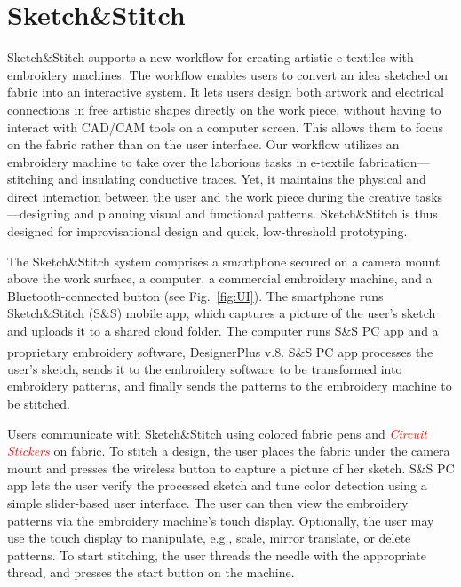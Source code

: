 \documentclass[header.tex]{subfiles}
\begin{document}
\section{Sketch\&Stitch}
Sketch\&Stitch supports a new workflow for creating artistic e-textiles with embroidery machines. The workflow enables users to convert an idea sketched on fabric into an interactive system. It lets users design both artwork and electrical connections in free artistic shapes directly on the work piece, without having to interact with CAD/CAM tools on a computer screen. This allows them to focus on the fabric rather than on the user interface. 
Our workflow utilizes an embroidery machine to take over the laborious tasks in e-textile fabrication---stitching and insulating conductive traces. Yet, it maintains the physical and direct interaction between the user and the work piece during the creative tasks---designing and planning visual and functional patterns. Sketch\&Stitch is thus designed for improvisational design and quick, low-threshold prototyping.



The Sketch\&Stitch system comprises a smartphone secured on a camera mount above the work surface, a computer, a commercial embroidery machine, and a Bluetooth-connected button (see Fig.\ \ref{fig:UI}). The smartphone runs Sketch\&Stitch (S\&S) mobile app, which captures a picture of the user's sketch and uploads it to a shared cloud folder. The computer runs S\&S PC app and a proprietary embroidery software, DesignerPlus\textsuperscript{\textregistered} v.8. S\&S PC app processes the user's sketch, sends it to the embroidery software to be transformed into embroidery patterns, and finally sends the patterns to the embroidery machine to be stitched. 


Users communicate with Sketch\&Stitch using colored fabric pens and \textcolor{red}{\textit{Circuit Stickers}} on fabric.
To stitch a design, the user places the fabric under the camera mount and presses the wireless button to capture a picture of her sketch. S\&S PC app lets the user verify the processed sketch and tune color detection using a simple slider-based user interface. The user can then view the embroidery patterns via the embroidery machine's touch display. Optionally, the user may use the touch display to manipulate, e.g., scale, mirror translate, or delete patterns. %
To start stitching, the user threads the needle with the appropriate thread, and presses the start button on the machine.
\end{document}
